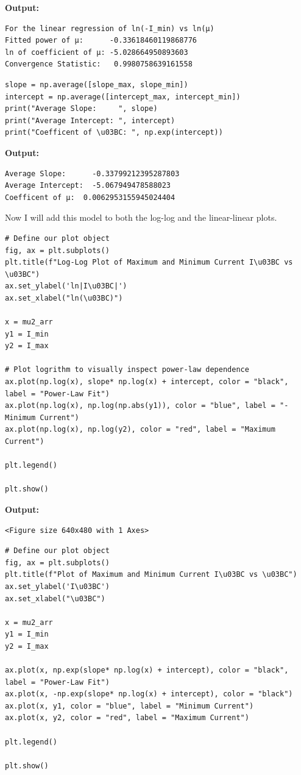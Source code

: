 \documentclass{article}
\begin{document}
\textbf{Output:}\begin{verbatim}
For the linear regression of ln(-I_min) vs ln(μ)
Fitted power of μ:      -0.33618460119868776
ln of coefficient of μ: -5.028664950893603
Convergence Statistic:   0.9980758639161558

\end{verbatim}

\begin{lstlisting}
slope = np.average([slope_max, slope_min])
intercept = np.average([intercept_max, intercept_min])
print("Average Slope:     ", slope)
print("Average Intercept: ", intercept)
print("Coefficent of \u03BC: ", np.exp(intercept))\end{lstlisting}

\textbf{Output:}\begin{verbatim}
Average Slope:      -0.33799212395287803
Average Intercept:  -5.067949478588023
Coefficent of μ:  0.0062953155945024404

\end{verbatim}

Now I will add this model to both the log-log and the linear-linear plots. 

\begin{lstlisting}
# Define our plot object
fig, ax = plt.subplots()
plt.title(f"Log-Log Plot of Maximum and Minimum Current I\u03BC vs \u03BC")
ax.set_ylabel('ln|I\u03BC|')
ax.set_xlabel("ln(\u03BC)")

x = mu2_arr
y1 = I_min
y2 = I_max

# Plot logrithm to visually inspect power-law dependence
ax.plot(np.log(x), slope* np.log(x) + intercept, color = "black", label = "Power-Law Fit")
ax.plot(np.log(x), np.log(np.abs(y1)), color = "blue", label = "- Minimum Current")
ax.plot(np.log(x), np.log(y2), color = "red", label = "Maximum Current")

plt.legend()

plt.show()\end{lstlisting}

\textbf{Output:}\begin{verbatim}
<Figure size 640x480 with 1 Axes>
\end{verbatim}

\begin{lstlisting}
# Define our plot object
fig, ax = plt.subplots()
plt.title(f"Plot of Maximum and Minimum Current I\u03BC vs \u03BC")
ax.set_ylabel('I\u03BC')
ax.set_xlabel("\u03BC")

x = mu2_arr
y1 = I_min
y2 = I_max

ax.plot(x, np.exp(slope* np.log(x) + intercept), color = "black", label = "Power-Law Fit")
ax.plot(x, -np.exp(slope* np.log(x) + intercept), color = "black")
ax.plot(x, y1, color = "blue", label = "Minimum Current")
ax.plot(x, y2, color = "red", label = "Maximum Current")

plt.legend()

plt.show()\end{lstlisting}
\end{document}
